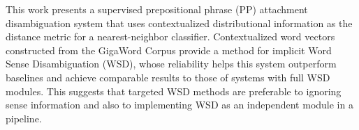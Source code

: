 This work presents a supervised prepositional phrase (PP) attachment disambiguation system that uses contextualized distributional information as the distance metric for a nearest-neighbor classifier.              Contextualized word vectors constructed from the GigaWord Corpus provide a method for implicit Word Sense Disambiguation (WSD), whose reliability helps this system outperform baselines and achieve comparable results to those of systems with full WSD modules.  This suggests that targeted WSD methods are preferable to ignoring sense information and also to implementing WSD as an independent module in a pipeline.
